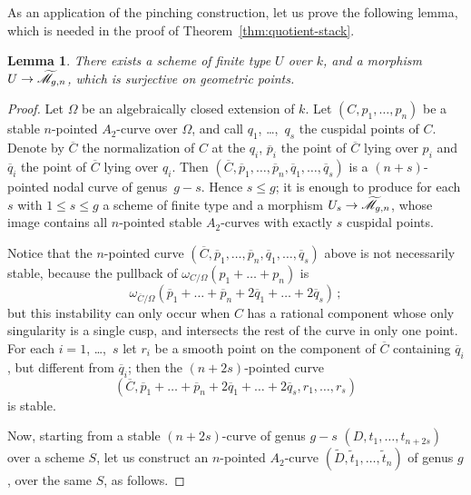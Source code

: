 \documentclass[a4paper, 10pt]{amsart}
\numberwithin{equation}{section}
\numberwithin{subsection}{section}
\newtheorem{lemma}[theorem]{Lemma}
\theoremstyle{definition}
\theoremstyle{remark}
\renewcommand{\mathcal}{\mathscr}
\newcommand\arr{\ifinner\to\else\longrightarrow\fi}
\newcommand{\mt}{\widetilde{\mathcal M}}
\begin{document}
	
	As an application of the pinching construction, let us prove the following lemma, which is needed in the proof of Theorem~\ref{thm:quotient-stack}.
	
	\begin{lemma}\label{lem:boundedness}
		There exists a scheme of finite type $U$ over $k$, and a morphism $U \arr\mt_{g,n}$, which is surjective on geometric points.
	\end{lemma}
	
	\begin{proof}
		Let $\Omega$ be an algebraically closed extension of $k$. Let $(C, p_{1}, \dots, p_{n})$ be a stable $n$-pointed $A_{2}$-curve over $\Omega$, and call $q_{1}$, \dots,~$q_{s}$ the cuspidal points of $C$. Denote by $\overline{C}$ the normalization of $C$ at the $q_{i}$, $\overline{p}_{i}$ the point of $\overline{C}$ lying over $p_{i}$ and $\overline{q}_{i}$ the point of $\overline{C}$ lying over $q_{i}$. Then $(\overline{C}, \overline{p}_{1}, \dots, \overline{p}_{n}, \overline{q}_{1}, \dots, \overline{q}_{s})$ is a $(n+s)$-pointed nodal curve of genus~$g-s$. Hence $s \leq g$; it is enough to produce for each $s$ with $1 \leq s \leq g$ a scheme of finite type and a morphism $U_{s} \arr \mt_{g,n}$, whose image contains all $n$-pointed stable $A_{2}$-curves with exactly $s$ cuspidal points.
		
		Notice that the $n$-pointed curve $(\overline{C}, \overline{p}_{1}, \dots, \overline{p}_{n}, \overline{q}_{1}, \dots, \overline{q}_{s})$ above is not necessarily stable, because the pullback of $\omega_{C/\Omega}(p_{1}+ \dots + p_{n})$ is
		\[
		\omega_{\overline{C}/\Omega}(\overline{p}_{1}+ \dots + \overline{p}_{n} + 2\overline{q}_{1} + \dots + 2\overline{q}_{s})\,;
		\]
		but this instability can only occur when $C$ has a rational component whose only singularity is a single cusp, and intersects the rest of the curve in only one point. For each $i = 1$, \dots,~$s$ let $r_{i}$ be a smooth point on the component of $\overline{C}$ containing $\overline{q}_{i}$, but different from $\overline{q}_{i}$; then the $(n+2s)$-pointed curve
		\[
		(\overline{C}, \overline{p}_{1}+ \dots + \overline{p}_{n} + 2\overline{q}_{1} + \dots + 2\overline{q}_{s}, r_{1}, \dots, r_{s})
		\]
		is stable. 
		
		Now, starting from a stable $(n+2s)$-curve of genus $g-s$ $(D, t_{1}, \dots, t_{n+2s})$ over a scheme $S$, let us construct an $n$-pointed $A_{2}$-curve $(\widetilde{D}, \widetilde{t}_{1}, \dots, \widetilde{t}_{n})$ of genus $g$, over the same $S$, as follows.
		

\end{proof}
\end{document}
